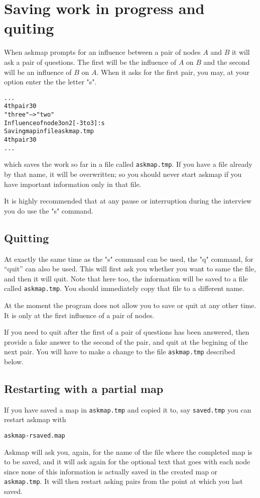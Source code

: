 \documentclass[%
	11pt,
        a4paper,
        twoside]{workrep}
\newcommand*{\prg}[1]{\textsf{#1}}		%
\newcommand*{\file}[1]{\texttt{#1}}		%
\begin{document}
\section{Saving work in progress and quiting}

When \prg{askmap} prompts for an influence
between a pair of nodes $A$ and $B$ it will ask a pair
of questions.  The first will be the influence of $A$ on $B$ and the
second will be an influence of $B$ on $A$.   When it asks for the
first pair, you may, at your option enter the the letter "s".
\begin{alltt}
...
4th pair 30% done
"three" ---> "two"
Influence of node 3 on 2 [-3 to 3]: s
Saving map in file askmap.tmp
4th pair 30% done
...
\end{alltt}
which saves the work so far in a file called \file{askmap.tmp}.  If you
have a file already by that name, it will be overwritten; so you should
never start \prg{askmap} if you have important information only
in that file.

It is highly recommended that at any pause or interruption
during the interview you do use the "s" command.

\subsection{Quitting}
At exactly the same time as the "s" command can be used, the "q" command,
for ``quit'' can also be used.  This will first ask you whether you
want to same the file, and then it will quit.  Note that here too, the
information will be saved to a file called \file{askmap.tmp}.  You should
immediately copy that file to a different name.

At the moment the program does not allow you to save or quit at any other
time.  It is only at the first influence of a pair of nodes.

If you need to quit after the first of a pair of questions has been
answered, then provide a fake answer to the second of the pair, and quit
at the begining of the next pair.  You will have to make a change to the
file \file{askmap.tmp} described below.

\subsection{Restarting with a partial map}

If you have saved a map in \file{askmap.tmp} and copied it to,
say \file{saved.tmp} you can restart askmap with
\begin{alltt}
askmap -r saved.map
\end{alltt}
\prg{Askmap} will ask you, again, for the name of the file where the
completed map is to be saved, and it will ask again for the optional
text that goes with each node since none of this information is actually
saved in the created map or \file{askmap.tmp}.  It will then restart
asking pairs from the point at which you last saved.
\end{document}
